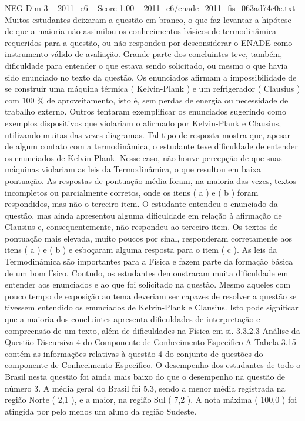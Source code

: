 \begin{textsample}{NEG Dim 3 – 2011\_c6 – Score 1.00 – 2011\_c6/enade\_2011\_fis\_063ad74c0e.txt}
Muitos estudantes deixaram a questão em branco, o que faz levantar a hipótese de que a maioria não assimilou os conhecimentos básicos de termodinâmica requeridos para a questão, ou não respondeu por desconsiderar o ENADE como instrumento válido de avaliação.
Grande parte dos concluintes teve, também, dificuldade para entender o que estava sendo solicitado, ou mesmo o que havia sido enunciado no texto da questão.
Os enunciados afirmam a impossibilidade de se construir uma máquina térmica ( Kelvin-Plank ) e um refrigerador ( Clausius ) com 100 \% de aproveitamento, isto é, sem perdas de energia ou necessidade de trabalho externo.
Outros tentaram exemplificar os enunciados sugerindo como exemplos dispositivos que violariam o afirmado por Kelvin-Plank e Clausius, utilizando muitas das vezes diagramas.
Tal tipo de resposta mostra que, apesar de algum contato com a termodinâmica, o estudante teve dificuldade de entender os enunciados de Kelvin-Plank.
Nesse caso, não houve percepção de que suas máquinas violariam as leis da Termodinâmica, o que resultou em baixa pontuação.
As respostas de pontuação média foram, na maioria das vezes, textos incompletos ou parcialmente corretos, onde os itens ( a ) e ( b ) foram respondidos, mas não o terceiro item.
O estudante entendeu o enunciado da questão, mas ainda apresentou alguma dificuldade em relação à afirmação de Clausius e, consequentemente, não respondeu ao terceiro item.
Os textos de pontuação mais elevada, muito poucos por sinal, responderam corretamente aos itens ( a ) e ( b ) e esboçaram alguma resposta para o item ( c ).
As leis da Termodinâmica são importantes para a Física e fazem parte da formação básica de um bom físico.
Contudo, os estudantes demonstraram muita dificuldade em entender aos enunciados e ao que foi solicitado na questão.
Mesmo aqueles com pouco tempo de exposição ao tema deveriam ser capazes de resolver a questão se tivessem entendido os enunciados de Kelvin-Plank e Clausius.
Isto pode significar que a maioria dos concluintes apresenta dificuldades de interpretação e compreensão de um texto, além de dificuldades na Física em si. 3.3.2.3 Análise da Questão Discursiva 4 do Componente de Conhecimento Específico A Tabela 3.15 contém as informações relativas à questão 4 do conjunto de questões do componente de Conhecimento Específico.
O desempenho dos estudantes de todo o Brasil nesta questão foi ainda mais baixo do que o desempenho na questão de número 3.
A média geral do Brasil foi 5,3, sendo a menor média registrada na região Norte ( 2,1 ), e a maior, na região Sul ( 7,2 ).
A nota máxima ( 100,0 ) foi atingida por pelo menos um aluno da região Sudeste.

\end{textsample}
